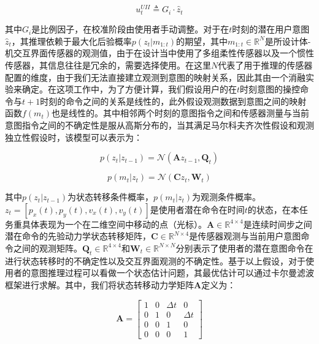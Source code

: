 \begin{equation}
\label{eq3}
u_t^{UII} \triangleq {G_i} \cdot {\hat z_t}
\end{equation}    

其中$G_i$是比例因子，在校准阶段由使用者手动调整。对于在$t$时刻的潜在用户意图${\hat z_t}$，其推理依赖于最大化后验概率$p({z_t}|{m_{1:t}})$的期望，其中$m_{1:t} \in {\mathbb{R}^{N}}$是所设计体-机交互界面传感器的观测值，由于在设计当中使用了多组柔性传感器以及一个惯性传感器，其信息往往是冗余的，需要选择使用。在这里$N$代表了用于推理的传感器配置的维度，由于我们无法直接建立观测到意图的映射关系，因此其由一个消融实验来确定。在这项工作中，为了方便计算，我们假设用户的在$t$时刻意图的操控命令与$t+1$时刻的命令之间的关系是线性的，此外假设观测数据到意图之间的映射函数$f(m_t)$也是线性的。其中相邻两个时刻的意图指令之间和传感器测量与当前意图指令之间的不确定性是服从高斯分布的，当其满足马尔科夫齐次性假设和观测独立性假设时，该模型可以表示为：

\begin{equation}
\label{eq4}
p({z_t}|{z_{t - 1}}) = \mathcal{N}({\boldsymbol{A}}{z_{t - 1}},{{\boldsymbol{Q}}_t})
\end{equation}   

\begin{equation}
\label{eq5}
p({m_t}|{z_t}) = \mathcal{N}({\boldsymbol{C}}{z_t},{{\boldsymbol{W}}_t})
\end{equation}    

其中$p({z_t}|{z_{t - 1}})$为状态转移条件概率，$p({m_t}|{z_t})$为观测条件概率。${z_t} = [{p_x}(t),{p_y}(t),{v_x}(t),{v_y}(t)]$是使用者潜在命令在时间$t$的状态，在本任务重具体表现为一个在二维空间中移动的点（光标）。${\boldsymbol{A}} \in {\mathbb{R}^{4 \times 4}}$是连续时间步之间潜在命令的先验动力学状态转移矩阵，${\boldsymbol{C}} \in {\mathbb{R}^{N \times 4}}$是传感器观测与当前用户意图命令之间的观测矩阵。${{\boldsymbol{Q}}_t} \in {\mathbb{R}^{4 \times 4}}$和${{\boldsymbol{W}}_t} \in {\mathbb{R}^{N \times N}}$分别表示了使用者的潜在意图命令在进行状态转移时的不确定性以及交互界面观测的不确定性。基于以上假设，对于使用者的意图推理过程可以看做一个状态估计问题，其最优估计可以通过卡尔曼滤波框架进行求解。其中，我们将状态转移动力学矩阵${\boldsymbol{A}}$定义为：

\begin{equation}
\boldsymbol{A} = 
\begin{bmatrix}{}
1&0&{\Delta t}&0  \\  
0&1&0&{\Delta t}  \\  
0&0&1&0  \\  
0&0&0&1 
\end{bmatrix}
\end{equation} 


